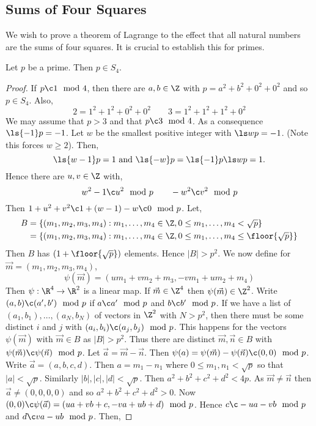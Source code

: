 \subsection{Sums of Four Squares}
We wish to prove a theorem of Lagrange to the effect that all natural numbers are the sums of four squares. It is crucial to establish this for primes.
\begin{nthm}
  Let $p$ be a prime. Then $p \in S_4$.
\end{nthm}
\begin{proof}
  If $p \c 1 \mod 4$, then there are $a, b \in \Z$ with $p = a^2 + b^2 + 0^2 + 0^2$ and so $p \in S_4$. Also,
  $$ 2 = 1^2 + 1^2 + 0^2 + 0^2 \qquad 3 = 1^2 + 1^2 + 1^2 + 0^2 $$
  We may assume that $p > 3$ and that $p \c 3 \mod 4$. As a consequence $\ls {-1} p = -1$. Let $w$ be the smallest positive integer with $\ls w p = -1$. (Note this forces $w \ge 2$). Then,
  $$ \ls {w-1} p = 1 \text{ and } \ls {-w} p = \ls {-1} p \ls w p = 1. $$
  Hence there are $u, v \in \Z$ with,
  $$ w^2 - 1 \c u^2 \mod p \qquad -w^2 \c v^2 \mod p $$
  Then $1 + u^2 + v^2 \c 1 + (w-1) - w \c 0 \mod p$. Let,
  \begin{align*}
    B &= \{(m_1, m_2, m_3, m_4) : m_1, \dots, m_4 \in \Z, 0 \le m_1,\dots, m_4 < \sqrt p\}\\
    &= \{(m_1, m_2, m_3, m_4) : m_1, \dots, m_4 \in \Z, 0 \le m_1,\dots, m_4 \le \floor{\sqrt p}\}
  \end{align*}
  Then $B$ has $(1 + \floor{\sqrt p})$ elements. Hence $|B| > p^2$. We now define for $\vec m = (m_1, m_2, m_3, m_4)$,
  $$ \psi(\vec m) = (um_1 + vm_2 + m_3, - vm_1 + um_2 + m_4) $$
  Then $\psi : \R^4 \to \R^2$ is a linear map. If $\vec m \in \Z^4$ then $\psi(\vec m)\in \Z^2$. Write $(a, b) \c (a', b') \mod p$ if $a \c a' \mod p$ and $b \c b' \mod p$. If we have a list of $(a_1, b_1), \dots, (a_N, b_N)$ of vectors in $\Z^2$ with $N> p^2$,
  then there must be some distinct $i$ and $j$ with $(a_i, b_i)\c (a_j, b_j) \mod p$. This happens for the vectors $\psi(\vec m)$ with $\vec m \in B$ as $|B| > p^2$. Thus there are distinct $\vec m, \vec n \in B$ with $\psi(\vec m)\c \psi(\vec n)\mod p$. Let $\vec a = \vec m - \vec n$. Then $\psi(a) = \psi(\vec m)- \psi(\vec n) \c (0, 0)\mod p$.
  Write $\vec a = (a, b, c, d)$. Then $a = m_1 - n_1$ where $0 \le m_1, n_1 < \sqrt{p}$ so that $|a| < \sqrt p$. Similarly $|b|, |c|, |d| < \sqrt p$. Then $a^2 + b^2 + c^2 + d^2 < 4p$. As $\vec m \ne \vec n$ then $\vec a \ne (0, 0, 0, 0)$ and so $a^2 + b^2 + c^2 + d^2 > 0$.
  Now $(0, 0) \c \psi(\vec a) = (ua + vb + c, -va + ub + d)\mod p$. Hence $c \c -ua - vb \mod p$ and $d\c va - ub \mod p$. Then,

\end{proof}
